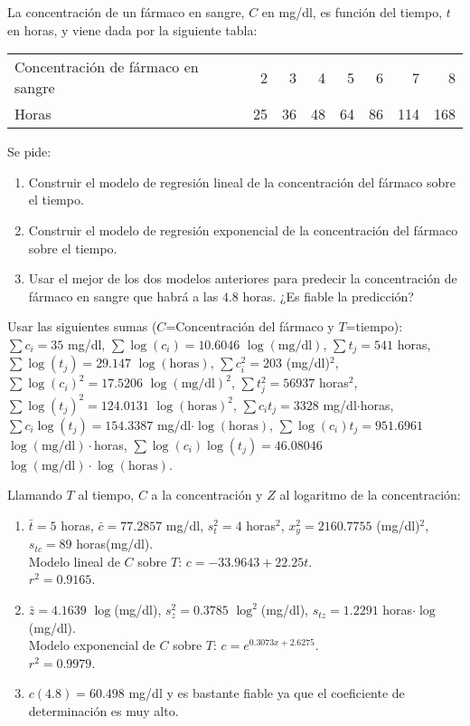 {La concentración de un fármaco en sangre, $C$ en mg/dl, es función del tiempo, $t$ en horas, y viene dada por la siguiente tabla: 
\begin{center}
\begin{tabular}{lrrrrrrr}
\toprule
Concentración de fármaco en sangre & 2 & 3 & 4 & 5 & 6 & 7 & 8\\
Horas & 25 & 36 & 48 & 64 & 86 & 114 & 168\\
\bottomrule
\end{tabular}
\end{center}
Se pide:
\begin{enumerate}
\item Construir el modelo de regresión lineal de la concentración del fármaco sobre el tiempo.
\item Construir el modelo de regresión exponencial de la concentración del fármaco sobre el tiempo.
\item Usar el mejor de los dos modelos anteriores para predecir la concentración de fármaco en sangre que habrá a las $4.8$ horas.
¿Es fiable la predicción?
\end{enumerate}

Usar las siguientes sumas ($C$=Concentración del fármaco y $T$=tiempo): $\sum c_i=35$ mg/dl, $\sum \log(c_i)=10.6046$
$\log(\mbox{mg/dl})$, $\sum t_j=541$ horas, $\sum \log(t_j)= 29.147$ $\log(\mbox{horas})$, $\sum c_i^2=203$ (mg/dl)$^2$,
$\sum \log(c_i)^2=17.5206$ $\log(\mbox{mg/dl})^2$, $\sum t_j^2=56937$ horas$^2$, $\sum \log(t_j)^2=124.0131$
$\log(\mbox{horas})^2$, $\sum c_it_j=3328$ mg/dl$\cdot$horas, $\sum c_i\log(t_j)=154.3387$
mg/dl$\cdot\log(\mbox{horas})$, $\sum \log(c_i)t_j=951.6961$ $\log(\mbox{mg/dl})\cdot$horas, $\sum
\log(c_i)\log(t_j)=46.08046$ $\log(\mbox{mg/dl})\cdot\log(\mbox{horas})$.
}
{Llamando $T$ al tiempo, $C$ a la concentración y $Z$ al logaritmo de la concentración:
\begin{enumerate}
\item $\bar t=5$ horas, $\bar c=77.2857$ mg/dl, $s_t^2=4$ horas$^2$,  $x_𝑦^2=2160.7755$ (mg/dl)$^2$, $s_{tc}=89$ horas(mg/dl).\\
Modelo lineal de $C$ sobre $T$: $c=−33.9643+22.25t$.\\
$r^2=0.9165$.
\item  $\bar z=4.1639$ $\log$(mg/dl), $s_z^2=0.3785$ $\log^2$(mg/dl),
$s_{tz}=1.2291$ horas$\cdot\log$(mg/dl).\\
Modelo exponencial de $C$ sobre $T$: $c=e^{0.3073x+2.6275}$.\\
$r^2=0.9979$.
\item $c(4.8)= 60.498$ mg/dl y es bastante fiable ya que el coeficiente de determinación es muy alto.

\end{enumerate}
}
